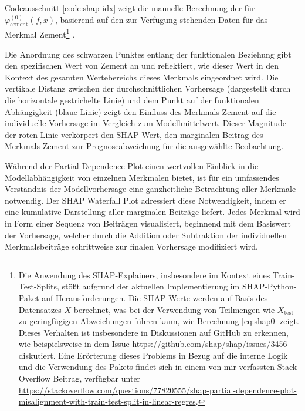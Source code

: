 Codeausschnitt \ref{code:shap-idx} zeigt die manuelle Berechnung der für $\varphi_{\text{cement}}^{(0)}(f, x)$, basierend
auf den zur Verfügung stehenden Daten für das Merkmal Zement\footnote{Die Anwendung des SHAP-Explainers, 
insbesondere im Kontext eines Train-Test-Splits, stößt aufgrund der aktuellen Implementierung im SHAP-Python-Paket 
auf Herausforderungen. Die SHAP-Werte werden auf Basis des Datensatzes $X$ berechnet, 
was bei der Verwendung von Teilmengen wie $X_{\text{test}}$ zu geringfügigen Abweichungen führen kann, wie Berechnung \ref{eq:shap0} zeigt.
Dieses Verhalten ist insbesondere in Diskussionen auf GitHub zu erkennen, wie beispielsweise in dem Issue 
\url{https://github.com/shap/shap/issues/3456} diskutiert. Eine Erörterung dieses Problems in Bezug auf die interne Logik und die Verwendung des Pakets
findet sich in einem von mir verfassten Stack Overflow Beitrag, verfügbar unter 
\url{https://stackoverflow.com/questions/77820555/shap-partial-dependence-plot-misalignment-with-train-test-split-in-linear-regres}.}
.



Die Anordnung des schwarzen Punktes entlang der funktionalen Beziehung gibt den spezifischen Wert 
von Zement an und reflektiert, wie dieser Wert in den Kontext des gesamten Wertebereichs dieses Merkmals 
eingeordnet wird. Die vertikale Distanz zwischen der durchschnittlichen Vorhersage (dargestellt durch die horizontale 
gestrichelte Linie) und dem Punkt auf der funktionalen Abhängigkeit (blaue Linie) zeigt den Einfluss des Merkmals 
Zement auf die individuelle Vorhersage im Vergleich zum Modellmittelwert. Dieser Magnitude der roten Linie verkörpert den SHAP-Wert,
den marginalen Beitrag des Merkmals Zement zur Prognoseabweichung für die ausgewählte Beobachtung.

Während der Partial Dependence Plot einen wertvollen Einblick in die Modellabhängigkeit von 
einzelnen Merkmalen bietet, ist für ein umfassendes Verständnis der Modellvorhersage eine ganzheitliche 
Betrachtung aller Merkmale notwendig. Der SHAP Waterfall Plot adressiert diese Notwendigkeit, 
indem er eine kumulative Darstellung aller marginalen Beiträge liefert. Jedes Merkmal wird in 
Form einer Sequenz von Beiträgen visualisiert, beginnend mit dem Basiswert der Vorhersage, welcher 
durch die Addition oder Subtraktion der individuellen Merkmalsbeiträge schrittweise zur finalen Vorhersage 
modifiziert wird.

